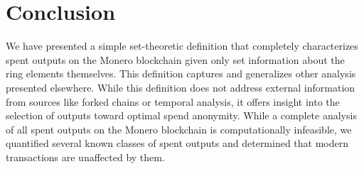 \documentclass{mrl}
\begin{document}
\section{Conclusion}
We have presented a simple set-theoretic definition that completely characterizes spent outputs on the Monero blockchain given only set information about the ring elements themselves. This definition captures and generalizes other analysis presented elsewhere. While this definition does not address external information from sources like forked chains or temporal analysis, it offers insight into the selection of outputs toward optimal spend anonymity. While a complete analysis of all spent outputs on the Monero blockchain is computationally infeasible, we quantified several known classes of spent outputs and determined that modern transactions are unaffected by them.


\nocite{*}

\end{document}
